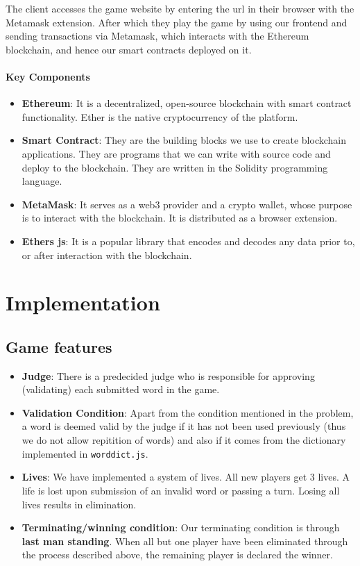 \documentclass{article}
\begin{document}
The client accesses the game website by entering the url in their browser with the Metamask extension. 
After which they play the game by using our frontend and sending transactions via Metamask, which interacts with the Ethereum blockchain, and hence our smart contracts deployed on it.

\paragraph{Key Components}
\begin{itemize}
\item[] \textbf{Ethereum}: It is a decentralized, open-source blockchain with smart contract functionality. Ether is the native cryptocurrency of the platform.
\item[] \textbf{Smart Contract}: They are the building blocks we use to create blockchain applications. They are programs that we can write with source code and deploy to the blockchain. They are written in the Solidity programming language. 
\item[] \textbf{MetaMask}: It serves as a web3 provider and a crypto wallet, whose purpose is to interact with the blockchain. It is distributed as a browser extension. 
\item[] \textbf{Ethers js}: It is a popular library that encodes and decodes any data prior to, or after interaction with the blockchain.

\end{itemize}



\section{Implementation}

\subsection{Game features}

\begin{itemize}
    \item[] \textbf{Judge}:
    There is a predecided judge who is responsible for approving (validating) each
    submitted word in the game.
    \item[] \textbf{Validation Condition}:
    Apart from the condition mentioned in the problem, a word is deemed valid by the
    judge if it has not been used previously (thus we do not allow repitition of words)
    and also if it comes from the dictionary implemented in \verb|worddict.js|.
    \item[] \textbf{Lives}:
    We have implemented a system of lives. All new players get 3 lives. A life is lost upon submission of an invalid word or passing a turn. Losing all lives results in elimination. 
    \item[] \textbf{Terminating/winning condition}: 
    Our terminating condition is through \textbf{last man standing}. When all but one
    player have been eliminated through the process described above, the remaining
    player is declared the winner.
    
\end{itemize}
\end{document}
